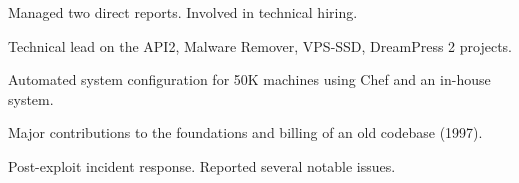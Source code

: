 
\item {}
  Managed two direct reports.
  Involved in technical hiring.

\item {}
  Technical lead on the API2, Malware Remover, VPS-SSD, DreamPress 2 projects.

\item {}
  Automated system configuration for 50K machines using Chef and an in-house system.

\item {} Major contributions to the foundations and billing of an old codebase (1997).

\item {}
  Post-exploit incident response.
  Reported several notable issues.



